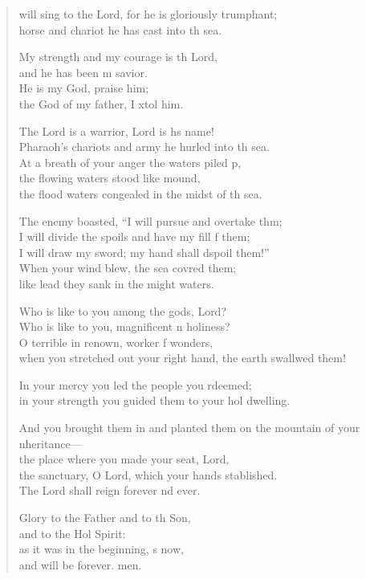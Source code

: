 \settowidth{\versewidth}{And you brought them in and planted them on the mountain of your inheritance— *}
\begin{verse}%
  \begin{patverse}
     will sing to the Lord, for he is gloriously tr\pointup{\i}umphant;\Med\\
horse and chariot he has cast into th sea.

My strength and my courage is th Lord,\Med\\
and he has been m savior.\\
He is my God,  praise him;\Med\\
the God of my father, I xtol him.

The Lord is a warrior, Lord is h\pointup{\i}s name!\Med\\
Pharaoh’s chariots and army he hurled into th sea.\\
At a breath of your anger the waters piled p,\Flex\\
the flowing waters stood like  mound,\Med\\
the flood waters congealed in the midst of th sea.

The enemy boasted, “I will pursue and overtake thm;\Flex\\
I will divide the spoils and have my fill f them;\Med\\
I will draw my sword; my hand shall dspoil them!”\\
When your wind blew, the sea covred them;\Med\\
like lead they sank in the might waters.

Who is like to you among the gods,  Lord?\Med\\
Who is like to you, magnificent \pointup{\i}n holiness?\\
O terrible in renown, worker f wonders,\Med\\
when you stretched out your right hand, the earth swallwed them!

In your mercy you led the people you rdeemed;\Med\\
in your strength you guided them to your hol dwelling.

And you brought them in and planted them on the mountain of your \pointup{\i}nheritance—\Med\\
the place where you made your seat,  Lord,\\
the sanctuary, O Lord, which your hands stablished.\Med\\
The Lord shall reign forever nd ever.

Glory to the Father and to th Son,\Med\\
and to the Hol Spirit:\\
as it was in the beginning, \pointup{\i}s now,\Med\\
and will be forever. men. 
  \end{patverse}
\end{verse}
